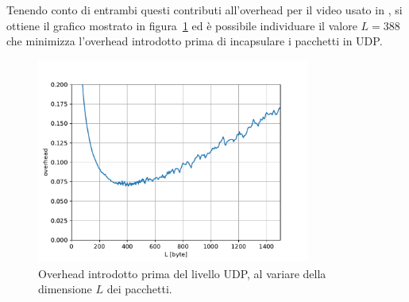 \documentclass[italian, a4paper, 12pt]{article}
\begin{document}
Tenendo conto di entrambi questi contributi all'overhead per il video
usato in \cite{uep}, si ottiene il grafico mostrato in
figura~\ref{fig:pktsize} ed è possibile individuare il valore $L =
388$ che minimizza l'overhead introdotto prima di incapsulare i
pacchetti in UDP.
\begin{figure}[H]
  \centering
  \includegraphics[width=0.8\textwidth]{plot_overhead}
  \caption{Overhead introdotto prima del livello UDP, al variare della
    dimensione $L$ dei pacchetti.}
  \label{fig:pktsize}
\end{figure}
\end{document}

